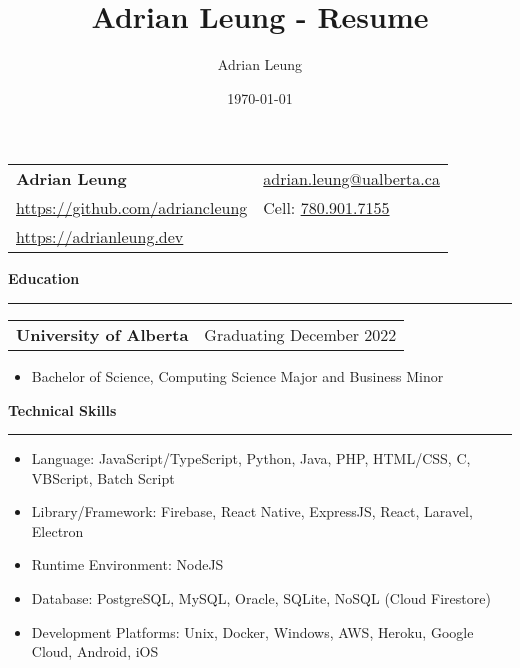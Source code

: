 \documentclass[11pt]{article}
\title{Adrian Leung - Resume}
\author{Adrian Leung}
\date{\today}
\newenvironment{compactList}
{
  \begin{itemize}
    \setlength{\itemsep}{0pt}
    \setlength{\parskip}{0pt}
}
{\end{itemize}}
\begin{document}
\begin{tabularx}{\textwidth}
  {
    >{\raggedright\arraybackslash}X
    >{\raggedleft\arraybackslash}X
  }
  \Large\textbf{Adrian Leung}                                             & \href{mailto:adrian.leung@ualberta.ca}{adrian.leung@ualberta.ca} \\
  \href{https://github.com/adriancleung}{https://github.com/adriancleung} & Cell: \href{tel:780.901.7155}{780.901.7155}                      \\
  \href{https://adrianleung.dev}{https://adrianleung.dev}                 &                                                                  \\
\end{tabularx}
\vspace{-15pt}

\begin{center}
  \textbf{Education}
  \noindent\rule[10pt]{0.9\paperwidth}{0.4pt}
\end{center}
\vspace{-20pt}
\begin{tabularx}{\textwidth}
  {
    >{\raggedright\arraybackslash}X
    >{\raggedleft\arraybackslash}X
  }
  \textbf{University of Alberta} & Graduating December 2022 \\
\end{tabularx}
\vspace{-20pt}
\begin{itemize}
  \item Bachelor of Science, Computing Science Major and Business Minor
\end{itemize}
\vspace{-15pt}

\begin{center}
  \textbf{Technical Skills}
  \noindent\rule[10pt]{0.9\paperwidth}{0.4pt}
\end{center}
\vspace{-30pt}
\begin{compactList}
  \item Language: JavaScript/TypeScript, Python, Java, PHP, HTML/CSS, C, VBScript, Batch Script
  \item Library/Framework: Firebase, React Native, ExpressJS, React, Laravel, Electron
  \item Runtime Environment: NodeJS
  \item Database: PostgreSQL, MySQL, Oracle, SQLite, NoSQL (Cloud Firestore)
  \item Development Platforms: Unix, Docker, Windows, AWS, Heroku, Google Cloud, Android, iOS
\end{compactList}
\vspace{-15pt}
\end{document}

